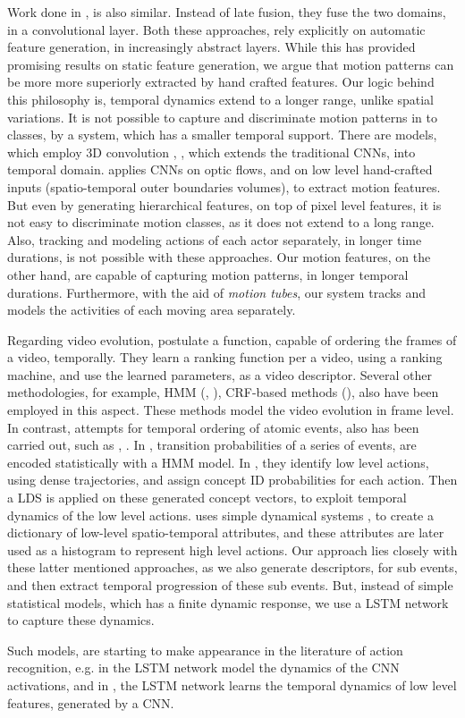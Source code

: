 Work done in \cite{feichtenhofer2016convolutional}, is also similar. Instead of late fusion, 
they fuse the two domains, in a convolutional layer. Both these approaches, rely explicitly on automatic feature 
generation, in increasingly abstract layers. While this has provided promising results on static feature generation,
we argue that motion patterns can be more more superiorly extracted by hand crafted features. Our logic behind
this philosophy is, temporal dynamics extend to a longer range, unlike spatial variations. It is not possible 
to capture and discriminate motion patterns in to classes, by a system, which has a smaller temporal support. There are models,
which employ 3D convolution \cite{ji20133d}, \cite{tran2015learning}, which extends the traditional CNNs, into temporal domain. 
\cite{7486474} applies CNNs on optic flows, and \cite{kim2007human} on low level hand-crafted inputs 
(spatio-temporal outer boundaries volumes), to extract motion features. But even by generating hierarchical 
features, on top of pixel level features, it is not easy to discriminate motion classes, as it does not extend to a long range. 
Also, tracking and modeling actions of each actor separately, in longer time durations, is not possible with these 
approaches. Our motion features, on the other hand, are capable of capturing motion patterns, in longer temporal durations.
Furthermore, with the aid of \textit{motion tubes}, our system tracks and models the activities of each moving area separately. 

Regarding video evolution, \cite{fernando2015modeling} postulate
a function, capable of ordering the frames of a video,
temporally. They learn a ranking function per a video, using a ranking machine, and use the learned parameters, as 
a video descriptor. Several other methodologies, for example, HMM (\cite{wang2011hidden}, \cite{wu2014leveraging}), 
CRF-based methods (\cite{song2013action}), also have been employed in this aspect. These methods model the video evolution in frame 
level. In contrast, attempts for temporal ordering of atomic events, also has been carried out, such as \cite{rohrbach2012script}, \cite{bhattacharya2014recognition}.
In \cite{rohrbach2012script}, transition probabilities of a series of events, are encoded statistically with a HMM model. 
In  \cite{bhattacharya2014recognition}, they identify low level actions, using dense trajectories, and assign concept ID 
probabilities for each action. Then a LDS is applied on these generated concept vectors, to exploit temporal 
dynamics of the low level actions. \cite{li2013recognizing} uses simple dynamical systems \cite{jackson1992perspectives},
\cite{kailath1974view} to create a dictionary of low-level spatio-temporal attributes, and these attributes 
are later used as a histogram to represent high level actions. Our approach lies closely with these latter
mentioned approaches, as we also generate descriptors, for sub events, and then extract temporal progression 
of these sub events. But, instead of simple statistical models, which has a finite dynamic response, 
we use a LSTM network \cite{hochreiter1997long} to capture these dynamics. 

Such models, are starting to make appearance in the literature of action recognition, e.g. in 
\cite{yue2015beyond} the LSTM network model the dynamics of the CNN activations, and in \cite{donahue2015long},
the LSTM network learns the temporal dynamics of low level features, generated by a CNN. 

